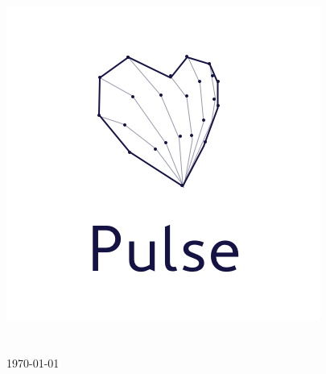 \clearpage

\begin{titlepage}
	\begin{center}
		\vspace*{\fill}
		\includegraphics[scale=0.8]{figures/pulse_logo_white.png}
		\\[0.5cm]
		\LARGE{\thistitle}
		\\[2.5cm]
		\Large{\authorname}
		\\[1.0cm]
		\today
		\vspace*{\fill}
	\end{center}
\end{titlepage}